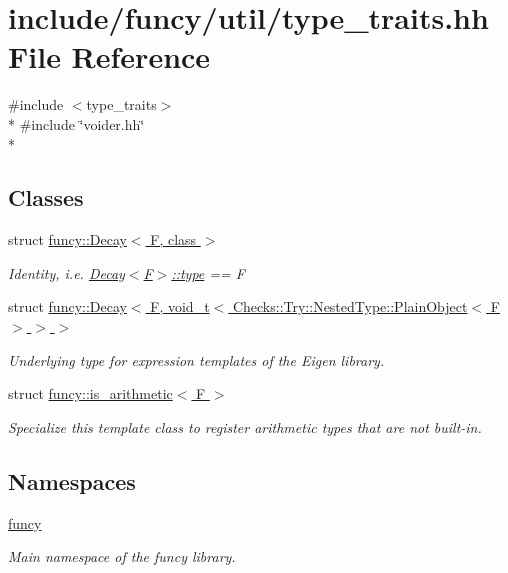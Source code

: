 \hypertarget{type__traits_8hh}{\section{include/funcy/util/type\-\_\-traits.hh File Reference}
\label{type__traits_8hh}
}
{\ttfamily \#include $<$type\-\_\-traits$>$}\\*
{\ttfamily \#include \char`\"{}voider.\-hh\char`\"{}}\\*
\subsection*{Classes}
\begin{DoxyCompactItemize}
\item 
struct \hyperlink{structfuncy_1_1Decay}{funcy\-::\-Decay$<$ F, class $>$}
\begin{DoxyCompactList}\small\item\em Identity, i.\-e. \hyperlink{structfuncy_1_1Decay_a94829178cc43a1c71c43511c8a8836c6}{Decay$<$\-F$>$\-::type} == F \end{DoxyCompactList}\item 
struct \hyperlink{structfuncy_1_1Decay_3_01F_00_01void__t_3_01Checks_1_1Try_1_1NestedType_1_1PlainObject_3_01F_01_4_01_4_01_4}{funcy\-::\-Decay$<$ F, void\-\_\-t$<$ Checks\-::\-Try\-::\-Nested\-Type\-::\-Plain\-Object$<$ F $>$ $>$ $>$}
\begin{DoxyCompactList}\small\item\em Underlying type for expression templates of the Eigen library. \end{DoxyCompactList}\item 
struct \hyperlink{structfuncy_1_1is__arithmetic}{funcy\-::is\-\_\-arithmetic$<$ F $>$}
\begin{DoxyCompactList}\small\item\em Specialize this template class to register arithmetic types that are not built-\/in. \end{DoxyCompactList}\end{DoxyCompactItemize}
\subsection*{Namespaces}
\begin{DoxyCompactItemize}
\item 
\hyperlink{namespacefuncy}{funcy}
\begin{DoxyCompactList}\small\item\em Main namespace of the funcy library. \end{DoxyCompactList}\end{DoxyCompactItemize}
